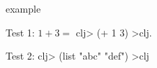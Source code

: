 \documentclass[14pt, a4paper]{extreport}
\begin{document}
example

Test 1: $1+3=$ {clj> (+ 1 3) >clj}.

Test 2: {clj> (list "abc" "def") >clj}
\end{document}
